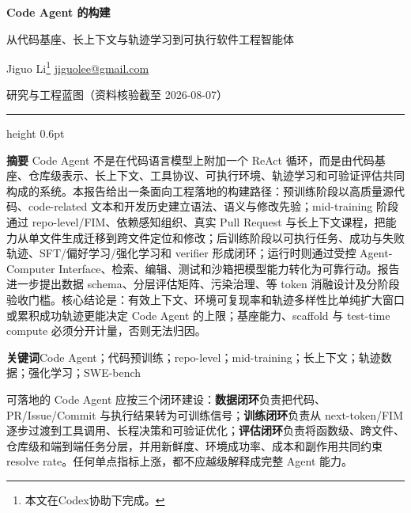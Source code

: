 \documentclass[10pt,a4paper,UTF8,fontset=none]{ctexart}
\begin{document}
\begin{center}
  {\bfseries\color{Navy} Code Agent 的构建\par}
  \vspace{4pt}
  {\color{Navy} 从代码基座、长上下文与轨迹学习到可执行软件工程智能体\par}
  \vspace{6pt}
  {\small Jiguo Li\footnote{{本文在Codex协助下完成。}}\quad
  \href{mailto:jiguolee@gmail.com}{jiguolee@gmail.com}\par}
  \vspace{4pt}
  {\small 研究与工程蓝图（资料核验截至 2026-08-07）\par}
\end{center}

\vspace{6pt}
{\color{Navy}\hrule height 0.6pt}
\vspace{8pt}

\noindent\textbf{摘要}\quad
Code Agent 不是在代码语言模型上附加一个 ReAct 循环，而是由代码基座、仓库级表示、长上下文、工具协议、可执行环境、轨迹学习和可验证评估共同构成的系统。本报告给出一条面向工程落地的构建路径：预训练阶段以高质量源代码、code-related 文本和开发历史建立语法、语义与修改先验；mid-training 阶段通过 repo-level/FIM、依赖感知组织、真实 Pull Request 与长上下文课程，把能力从单文件生成迁移到跨文件定位和修改；后训练阶段以可执行任务、成功与失败轨迹、SFT/偏好学习/强化学习和 verifier 形成闭环；运行时则通过受控 Agent-Computer Interface、检索、编辑、测试和沙箱把模型能力转化为可靠行动。报告进一步提出数据 schema、分层评估矩阵、污染治理、等 token 消融设计及分阶段验收门槛。核心结论是：有效上下文、环境可复现率和轨迹多样性比单纯扩大窗口或累积成功轨迹更能决定 Code Agent 的上限；基座能力、scaffold 与 test-time compute 必须分开计量，否则无法归因。

\vspace{5pt}
\noindent\textbf{关键词}\quad Code Agent；代码预训练；repo-level；mid-training；长上下文；轨迹数据；强化学习；SWE-bench

\begin{keybox}[阅读摘要]
可落地的 Code Agent 应按三个闭环建设：\textbf{数据闭环}负责把代码、PR/Issue/Commit 与执行结果转为可训练信号；\textbf{训练闭环}负责从 next-token/FIM 逐步过渡到工具调用、长程决策和可验证优化；\textbf{评估闭环}负责将函数级、跨文件、仓库级和端到端任务分层，并用新鲜度、环境成功率、成本和副作用共同约束 resolve rate。任何单点指标上涨，都不应越级解释成完整 Agent 能力。
\end{keybox}
\end{document}
